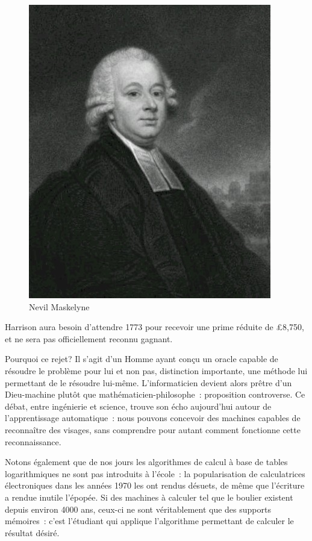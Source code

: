 \begin{minipage}[H]{0.49\linewidth}
  \begin{figure}[H]
  \centering
  \includegraphics[height=0.15\paperheight]{../resources/illustrations/maskelyne}
  \caption{Nevil Maskelyne}
  \end{figure}
\end{minipage}

Harrison aura besoin d'attendre 1773 pour recevoir une prime réduite de \pounds{8,750}, et ne sera pas officiellement reconnu gagnant.

Pourquoi ce rejet? Il s'agit d'un Homme ayant conçu un \og{}oracle\fg{} capable de résoudre le problème pour lui et non pas, distinction importante, une méthode lui permettant de le résoudre lui-même. L'informaticien devient alors prêtre d'un Dieu-machine plutôt que mathématicien-philosophe~: proposition controverse. Ce débat, entre ingénierie et science, trouve son écho aujourd'hui autour de l'apprentissage automatique~: nous pouvons concevoir des machines capables de reconnaître des visages, sans comprendre pour autant comment fonctionne cette reconnaissance. 

Notons également que de nos jours les algorithmes de calcul à base de tables logarithmiques ne sont pas introduits à l'école~: la popularisation de calculatrices électroniques dans les années 1970 les ont rendus désuets, de même que l'écriture a rendue inutile l'épopée. Si des machines à calculer tel que le boulier existent depuis environ 4000 ans, ceux-ci ne sont véritablement que des supports mémoires~: c'est l'étudiant qui applique l'algorithme permettant de calculer le résultat désiré. 

